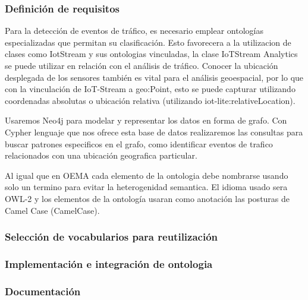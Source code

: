 \documentclass[12pt]{article}
\begin{document}
\subsubsection{Definición de requisitos}

Para la detección de eventos de tráfico, es necesario emplear ontologías especializadas que permitan su clasificación. Esto favorecera a la utilizacion de clases como IotStream y sus ontologias vinculadas, la clase IoTStream Analytics se puede utilizar en relación con el análisis de tráfico. Conocer la ubicación desplegada de los sensores también es vital para el análisis geoespacial, por lo que con la vinculación de IoT-Stream a geo:Point, esto se puede capturar utilizando coordenadas absolutas o ubicación relativa (utilizando iot-lite:relativeLocation).

Usaremos Neo4j para modelar y representar los datos en forma de grafo. Con Cypher lenguaje que nos ofrece esta base de datos realizaremos las consultas para buscar patrones especificos en el grafo, como identificar eventos de trafico relacionados con una ubicación geografica particular.

Al igual que en OEMA cada elemento de la ontologia debe nombrarse usando solo un termino para evitar la heterogenidad semantica. El idioma usado sera OWL-2 y los elementos de la ontología usaran como anotación las posturas de Camel Case (CamelCase).

\subsubsection{Selección de vocabularios para reutilización}

\subsubsection{Implementación e integración de ontologia}

\subsubsection{Documentación}
\end{document}
